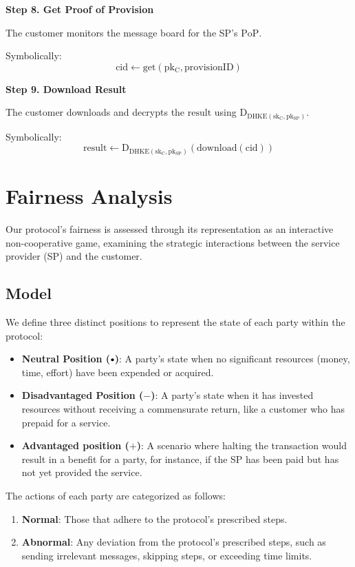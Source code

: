 \documentclass[pdftex,twocolumn,epjc3]{svjour3}
\newcommand{\plus}{+}
\newcommand{\minus}{-}
\newcommand\neutral[1][.75]{\mathbin{\ThisStyle{\vcenter{\hbox{%
  \scalebox{#1}{$\SavedStyle\bullet$}}}}}%
}
\begin{document}
\noindent \textbf{Step 8. Get Proof of Provision}\label{step-8-get-proof-of-provision}

The customer monitors the message board for the SP's $\mathrm{PoP}$.

Symbolically: 
\[
\mathrm{cid \gets get(pk_C, provisionID)}
\]

\noindent \textbf{Step 9. Download Result}\label{step-9-download-result}

The customer downloads and decrypts the $\mathrm{result}$ using $\mathrm{D_{DHKE(sk_C, pk_{SP})}}$.

Symbolically: 
\[
\mathrm{result \gets D_{DHKE(sk_C, pk_{SP})}(download(cid))}
\]

\section{Fairness Analysis}\label{sec:fairness-analysis}
Our protocol's fairness is assessed through its representation as an interactive non-cooperative game, examining the strategic interactions between the service provider (SP) and the customer.


\subsection{Model}\label{sec:fairness-model}
We define three distinct positions to represent the state of each party within the protocol:


\begin{itemize}
\item \textbf{Neutral Position ($\neutral{}$)}: A party's state when no significant resources (money, time, effort) have been expended or acquired.
\item \textbf{Disadvantaged Position ($\minus{}$)}: A party's state when it has invested resources without receiving a commensurate return, like a customer who has prepaid for a service.
\item \textbf{Advantaged position ($\plus{}$)}: A scenario where halting the transaction would result in a benefit for a party, for instance, if the SP has been paid but has not yet provided the service.
\end{itemize}

The actions of each party are categorized as follows:

\begin{enumerate}
\item \textbf{Normal}: Those that adhere to the protocol's prescribed steps.
\item \textbf{Abnormal}: Any deviation from the protocol's prescribed steps, such as sending irrelevant messages, skipping steps, or exceeding time limits.
\end{enumerate}
\end{document}
